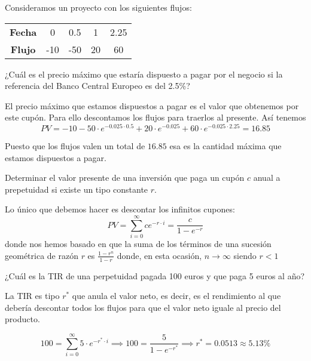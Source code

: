 \begin{problem}[5]
Consideramos un proyecto con los siguientes flujos:

\begin{center}
\begin{tabular}{|c|c|c|c|c|}
\hline
\textbf{Fecha} & 0 & 0.5 & 1 & 2.25 \\
\textbf{Flujo} & -10 & -50 & 20 & 60 \\
\hline
\end{tabular}
\end{center}

¿Cuál es el precio máximo que estaría dispuesto a pagar por el negocio si la referencia del Banco Central Europeo es del 2.5\%?

\solution

El precio máximo que estamos dispuestos a pagar es el valor que obtenemos por este cupón. Para ello descontamos los flujos para traerlos al presente. Así tenemos
\[PV = -10 -50\cdot e^{-0.025\cdot 0.5} + 20 \cdot e^{-0.025} + 60\cdot e^{-0.025\cdot 2.25} = 16.85\]

Puesto que los flujos valen un total de $16.85$ esa es la cantidad máxima que estamos dispuestos a pagar.
\end{problem}

\begin{problem}[6]
Determinar el valor presente de una inversión que paga un cupón $c$ anual a prepetuidad si existe un tipo constante $r$.
\solution

Lo único que debemos hacer es descontar los infinitos cupones:
\[PV = \sum_{i=0}^{\infty}ce^{-r\cdot i} = \frac{c}{1-e^{-r}}\]
donde nos hemos basado en que la suma de los términos de una sucesión geométrica de razón $r$ es $\frac{1-r^n}{1-r}$ donde, en esta ocasión, $n\to \infty$ siendo $r<1$
\end{problem}

\begin{problem}[7]
¿Cuál es la TIR de una perpetuidad pagada 100 euros y que paga 5 euros al año?
\solution

La TIR es tipo $r^*$ que anula el valor neto, es decir, es el rendimiento al que debería descontar todos los flujos para que el valor neto iguale al precio del producto.

\[100 = \sum_{i=0}^{\infty}5\cdot e^{-r^*\cdot i} \implies 100 = \frac{5}{1-e^{-r^*}} \implies r^* =0.0513 \approx 5.13\%\]
\end{problem}

